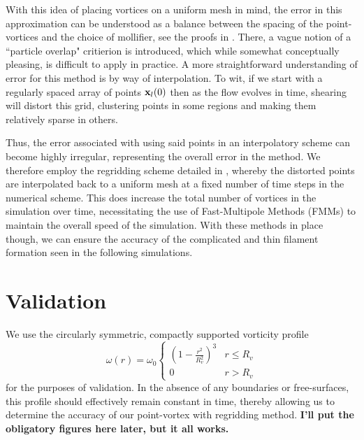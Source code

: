 \documentclass[a4paper,11pt]{article}
\newcommand{\ba}{\begin{array}}
\newcommand{\ea}{\end{array}}
\begin{document}
With this idea of placing vortices on a uniform mesh in mind, the error in this approximation can be understood as a balance between the spacing of the point-vortices and the choice of mollifier, see the proofs in \cite{cottet}.  There, a vague notion of a ``particle overlap" critierion is introduced, which while somewhat conceptually pleasing, is difficult to apply in practice.  A more straightforward understanding of error for this method is by way of interpolation.  To wit, if we start with a regularly spaced array of points ${\bf x}_{l}(0)$ then as the flow evolves in time, shearing will distort this grid, clustering points in some regions and making them relatively sparse in others.  

Thus, the error associated with using said points in an interpolatory scheme can become highly irregular, representing the overall error in the method.  We therefore employ the regridding scheme detailed in \cite{cottet}, whereby the distorted points are interpolated back to a uniform mesh at a fixed number of time steps in the numerical scheme.  This does increase the total number of vortices in the simulation over time, necessitating the use of Fast-Multipole Methods (FMMs) to maintain the overall speed of the simulation.  With these methods in place though, we can ensure the accuracy of the complicated and thin filament formation seen in the following simulations.      

\section*{Validation}
We use the circularly symmetric, compactly supported vorticity profile
\[
\omega(r) = \omega_{0}\left\{  \ba{rl} \left(1-\frac{r^{2}}{R_{v}^{2}}\right)^{3} & r\leq R_{v} \\ 0 & r>R_{v} \ea\right.
\] 
for the purposes of validation.  In the absence of any boundaries or free-surfaces, this profile should effectively remain constant in time, thereby allowing us to determine the accuracy of our point-vortex with regridding method.  {\bf I'll put the obligatory figures here later, but it all works.}
\end{document}
